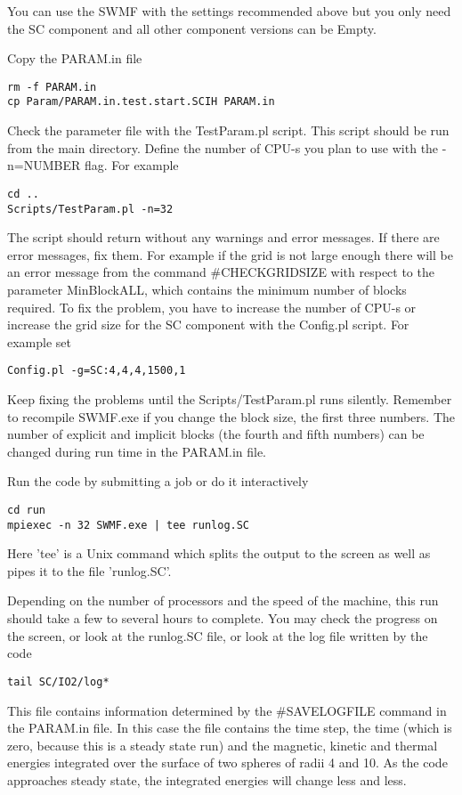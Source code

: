 You can use the SWMF with the settings recommended above
but you only need the SC component and
all other component versions can be Empty.

Copy the PARAM.in file
\begin{verbatim}
rm -f PARAM.in
cp Param/PARAM.in.test.start.SCIH PARAM.in
\end{verbatim}

Check the parameter file with the TestParam.pl script. 
This script should be run from the main directory.
Define the number of CPU-s you plan to use with the -n=NUMBER flag.
For example
\begin{verbatim}
cd ..
Scripts/TestParam.pl -n=32
\end{verbatim}
The script should return without any warnings and error messages.
If there are error messages, fix them. 
For example if the grid is not large enough there will be an 
error message from the command \#CHECKGRIDSIZE with respect
to the parameter  MinBlockALL, which contains the minimum number
of blocks required. To fix the problem, you have to increase the number 
of CPU-s or increase the grid size for the SC component with the 
Config.pl script. For example set
\begin{verbatim}
Config.pl -g=SC:4,4,4,1500,1
\end{verbatim}
Keep fixing the problems until the Scripts/TestParam.pl runs silently.
Remember to recompile SWMF.exe if you change the block size, the first
three numbers. The number of explicit and implicit blocks (the fourth
and fifth numbers) can be changed during run time in the PARAM.in file.

Run the code by submitting a job or do it interactively
\begin{verbatim}
cd run
mpiexec -n 32 SWMF.exe | tee runlog.SC
\end{verbatim}
Here 'tee' is a Unix command which splits the output to the screen as
well as pipes it to the file 'runlog.SC'. 

Depending on the number of processors and the speed of the machine,
this run should take a few to several hours to complete.
You may check the progress on the screen, or look at the 
runlog.SC file, or look at the log file written by the code
\begin{verbatim}
tail SC/IO2/log*
\end{verbatim}
This file contains information determined by the \#SAVELOGFILE command
in the PARAM.in file. In this case the file contains the time step, the
time (which is zero, because this is a steady state run) and the
magnetic, kinetic and thermal energies integrated over the surface of 
two spheres of radii 4 and 10. As the code approaches steady state,
the integrated energies will change less and less. 

